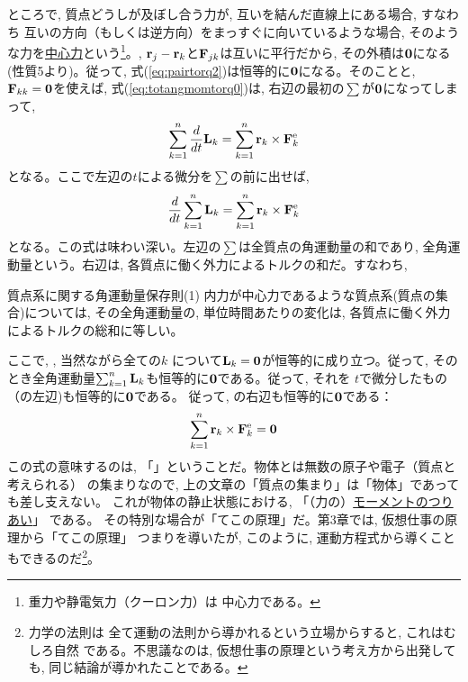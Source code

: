 ところで, 質点どうしが及ぼし合う力が, 互いを結んだ直線上にある場合, すなわち
互いの方向（もしくは逆方向）をまっすぐに向いているような場合, 
そのような力を\underline{中心力}という\footnote{重力や静電気力（クーロン力）は
中心力である。}。, ${\bf r}_j-{\bf r}_k$と${\bf F}_{jk}$は互いに平行だから, 
その外積は${\bf 0}$になる(性質5より)。従って, 
式(\ref{eq:pairtorq2})は恒等的に${\bf 0}$になる。そのことと, ${\bf F}_{kk}={\bf 0}$を使えば, 
式(\ref{eq:totangmomtorq0})は, 右辺の最初の$\sum$が${\bf 0}$になってしまって, 
\begin{eqnarray} 
\sum_{k=1}^n \frac{d}{dt}{\bf L}_k=\sum_{k=1}^n{\bf r}_k\times{\bf F}_{k}^{\text{e}}
\end{eqnarray} 
となる。ここで左辺の$t$による微分を$\sum$の前に出せば, 
\begin{eqnarray} 
\frac{d}{dt}\sum_{k=1}^n {\bf L}_k=\sum_{k=1}^n{\bf r}_k\times{\bf F}_{k}^{\text{e}}\label{eq:totangmomtorq1}
\end{eqnarray} 
となる。この式は味わい深い。左辺の$\sum$は全質点の角運動量の和であり, 
全角運動量という。右辺は, 各質点に働く外力によるトルクの和だ。すなわち, 
\begin{itembox}{質点系に関する角運動量保存則(1)}
内力が中心力であるような質点系(質点の集合)については, その全角運動量の, 
単位時間あたりの変化は, 各質点に働く外力によるトルクの総和に等しい。
\end{itembox}

ここで, , 当然ながら全ての$k$
について${\bf L}_k={\bf 0}$が恒等的に成り立つ。従って, 
そのとき全角運動量$\sum_{k=1}^n{\bf L}_k$も恒等的に${\bf 0}$である。従って, それを
$t$で微分したもの（の左辺)も恒等的に${\bf 0}$である。
従って, の右辺も恒等的に${\bf 0}$である：
\begin{eqnarray} 
\sum_{k=1}^n{\bf r}_k\times{\bf F}_{k}^{\text{e}}={\bf 0}\label{eq:totangmomtorq2}
\end{eqnarray} 
この式の意味するのは, 「」ということだ。物体とは無数の原子や電子（質点と考えられる）
の集まりなので, 上の文章の「質点の集まり」は「物体」であっても差し支えない。
これが物体の静止状態における, 「（力の）\underline{モーメントのつりあい}」
である。
その特別な場合が「てこの原理」だ。第3章では, 仮想仕事の原理から「てこの原理」
つまりを導いたが, このように, 
運動方程式から導くこともできるのだ\footnote{力学の法則は
全て運動の法則から導かれるという立場からすると, これはむしろ自然
である。不思議なのは, 仮想仕事の原理という考え方から出発しても, 
同じ結論が導かれたことである。}。\mv


